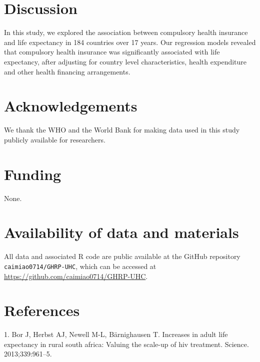 \documentclass[]{elsarticle} %
\begin{document}
\hypertarget{discussion}{%
\section{Discussion}\label{discussion}}

In this study, we explored the association between compulsory health insurance and life expectancy in 184 countries over 17 years. Our regression models revealed that compulsory health insurance was significantly associated with life expectancy, after adjusting for country level characteristics, health expenditure and other health financing arrangements.

\hypertarget{acknowledgements}{%
\section*{Acknowledgements}\label{acknowledgements}}

We thank the WHO and the World Bank for making data used in this study publicly available for researchers.

\hypertarget{funding}{%
\section*{Funding}\label{funding}}

None.

\hypertarget{availability-of-data-and-materials}{%
\section*{Availability of data and materials}\label{availability-of-data-and-materials}}

All data and associated R code are public available at the GitHub repository \texttt{caimiao0714/GHRP-UHC}, which can be accessed at \url{https://github.com/caimiao0714/GHRP-UHC}.

\hypertarget{references}{%
\section*{References}\label{references}}

\hypertarget{refs}{}
\leavevmode\hypertarget{ref-bor2013increases}{}%
1. Bor J, Herbst AJ, Newell M-L, Bärnighausen T. Increases in adult life expectancy in rural south africa: Valuing the scale-up of hiv treatment. Science. 2013;339:961--5.
\end{document}
